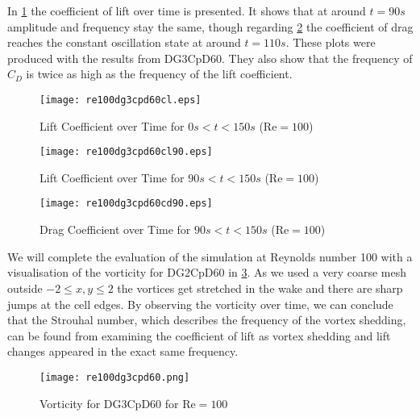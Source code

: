 In \cref{osci100} the coefficient of lift over time is presented. It shows that at around $t=90s$ amplitude and frequency stay the same, though regarding 
\cref{cdosci100} the coefficient of drag reaches the constant oscillation state at around $t=110s$. These plots were produced with the results from DG3CpD60. They also show that the frequency of $C_D$ is twice as high as the frequency of the lift coefficient. 
\begin{figure}[htp]	
	\centering
	\texttt{[image: re100dg3cpd60cl.eps]}
	\caption{Lift Coefficient over Time for $0s<t<150s$ ($\text{Re}=100$)}
	\label{osci100}	
\end{figure}
\begin{figure}[htp]	
	\begin{minipage}[b]{0.45\textwidth}
		\centering
		\texttt{[image: re100dg3cpd60cl90.eps]}
		\caption{Lift Coefficient over Time for $90s<t<150s$ ($\text{Re}=100$)}
		\label{cl10090}
	\end{minipage}
	\quad
	\begin{minipage}[b]{0.45\textwidth}
		\centering
		\texttt{[image: re100dg3cpd60cd90.eps]}
		\caption{Drag Coefficient over Time for $90s<t<150s$ ($\text{Re}=100$)}
		\label{cdosci100}	
	\end{minipage}
\end{figure}
		
		We will complete the evaluation of the simulation at Reynolds number 100 with a visualisation of the vorticity for DG2CpD60 in \cref{fig:vorticity100}. As we used a very coarse mesh outside $-2\leq x,y \leq 2$ the vortices get stretched in the wake and there are sharp jumps at the cell edges. By observing the vorticity over time, we can conclude that the Strouhal number, which describes the frequency of the vortex shedding, can be found from examining the coefficient of lift as vortex shedding and lift changes appeared in the exact same frequency.
		\begin{figure}[htp]
			\centering
			\texttt{[image: re100dg3cpd60.png]}
			\caption{Vorticity for DG3CpD60 for $\text{Re} = 100$}
			\label{fig:vorticity100}
		\end{figure}
		
		\newpage
